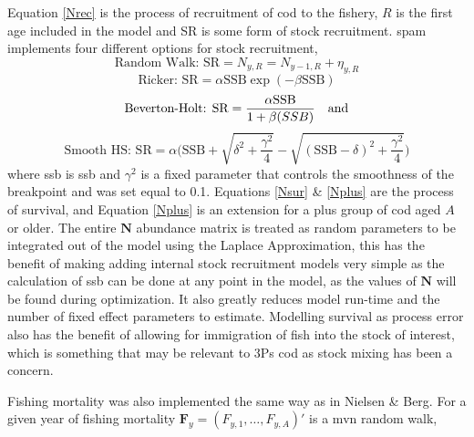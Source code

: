 \documentclass[11pt]{article}\usepackage[]{graphicx}\usepackage[]{color}
\begin{document}
Equation \ref{Nrec} is the process of recruitment of cod to the fishery, $R$ is the first age included in the model and SR is some form of stock recruitment. \acrshort{spam} implements four different options for stock recruitment, 
\begin{equation}\label{rw}
	\text{Random Walk: } \text{SR} = N_{y,R} = N_{y-1,R} + \eta_{y,R}
\end{equation}
\begin{equation}\label{ricker}
	\text{Ricker: } \text{SR} = \alpha\text{SSB}\exp(-\beta\text{SSB})
\end{equation}
\begin{equation}\label{BH}
\text{Beverton-Holt: } \text{SR} = \frac{\alpha\text{SSB}}{1+\beta\text(SSB)} \quad \text{and}  	
\end{equation}
\begin{equation}
	\text{Smooth HS: }\text{SR} = \alpha \bigg( \text{SSB} + \sqrt{\delta^2 + \frac{\gamma^2}{4}} 
	- \sqrt{(\text{SSB} - \delta)^2 + \frac{\gamma^2}{4}}\bigg)
\end{equation}
where \acrshort{ssb} is \acrfull{ssb} and $\gamma^2$ is a fixed parameter that controls the smoothness of the breakpoint and was set equal to 0.1. Equations \ref{Nsur} \& \ref{Nplus} are the process of survival, and Equation \ref{Nplus} is an extension for a plus group of cod aged $A$ or older. The entire $\bm{N}$ abundance matrix is treated as random parameters to be integrated out of the model using the Laplace Approximation, this has the benefit of making adding internal stock recruitment models very simple as the calculation of \acrshort{ssb} can be done at any point in the model, as the values of $\bm{N}$ will be found during optimization. It also greatly reduces model run-time and the number of fixed effect parameters to estimate. Modelling survival as process error also has the benefit of allowing for immigration of fish into the stock of interest, which is something that may be relevant to 3Ps cod as stock mixing has been a concern\cite{methot2005spatio}\cite{rideout2017assessing}.

Fishing mortality was also implemented the same way as in Nielsen \& Berg\cite{Nielsen2014Estimation-of-t}. For a given year of fishing mortality $\bm{F}_y=(F_{y,1},\dots,F_{y,A})'$ is a \acrfull{mvn} random walk, 
\end{document}
